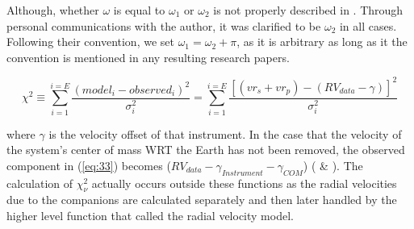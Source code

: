 \documentclass[10pt,preprint]{aastex}
\begin{document}
Although, whether $\omega$ is equal to $\omega_1$ or $\omega_2$ is not properly described in \citet{Shulze-Hartung}.  Through personal communications with the author, it was clarified to be $\omega_2$ in all cases.  Following their convention, we set $\omega_1 = \omega_2+\pi$, as it is arbitrary as long as it the convention is mentioned in any resulting research papers.

\begin{equation}\label{eq:33}
{\chi}^{2} \equiv  \sum_{i=1}^{i=E} \frac{(model_i - observed_i)^{2}}{\sigma^{2}_i} = \sum_{i=1}^{i=E} \frac{[(vr_s+vr_p) - (RV_{data}-\gamma)]^{2}}{\sigma^{2}_i}
\end{equation}

where $\gamma $ is the velocity offset of that instrument.  In the case that the velocity of the system's center of mass WRT the Earth has not been removed, the observed component in (\ref{eq:33}) becomes ($RV_{data}-\gamma_{Instrument}-\gamma_{COM}$) (\citet{Paddock} \& \citet{Shulze-Hartung}).  The calculation of $\chi^{2}_{\nu}$ actually occurs outside these functions as the radial velocities due to the companions are calculated separately and then later handled by the higher level function that called the radial velocity model.

\pagebreak

\clearpage
\end{document}
